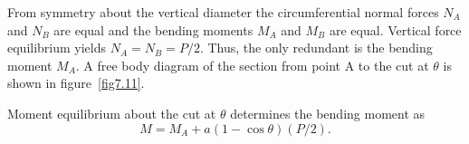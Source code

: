 \documentclass{AeroStructure-ERJohnson}
\begin{document}
\begin{example}
From symmetry about the vertical diameter the circumferential normal forces $N_{A}$ and $N_{B}$ are equal and the bending moments $M_{A}$ and $M_{B}$ are equal. Vertical force equilibrium yields $N_{A}=N_{B}=P / 2$. Thus, the only redundant is the bending moment $M_{A}$. A free body diagram of the section from point A to the cut at $\theta$ is shown in figure~\ref{fig7.11}.


{\def\thefigure{7.11}
\vspace*{-\baselineskip}
}
\vspace*{-\baselineskip}

Moment equilibrium about the cut at $\theta$ determines the bending moment as
\begin{equation}
M=M_{A}+a(1-\cos \theta)(P / 2). \label{eq7.4.a}\tag{a}
\end{equation}


\end{example}
\end{document}
